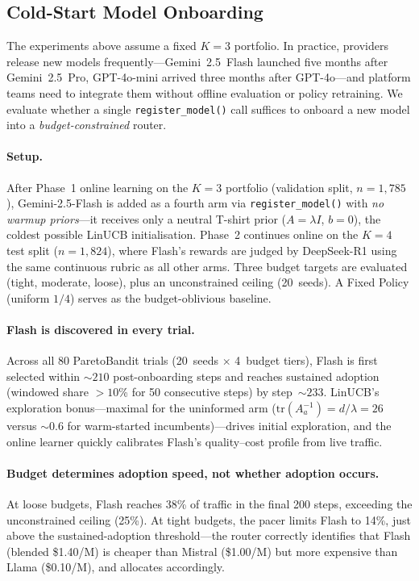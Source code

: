 \subsection{Cold-Start Model Onboarding}
\label{sec:exp4_model_onboarding}

The experiments above assume a fixed $K{=}3$ portfolio.  In practice, providers release new models frequently---Gemini~2.5~Flash launched five months after Gemini~2.5~Pro, GPT-4o-mini arrived three months after GPT-4o---and platform teams need to integrate them without offline evaluation or policy retraining.
We evaluate whether a single \texttt{register\_model()} call suffices to onboard a new model into a \emph{budget-constrained} router.

\paragraph{Setup.}
After Phase~1 online learning on the $K{=}3$ portfolio (validation split, $n{=}1{,}785$), Gemini-2.5-Flash is added as a fourth arm via \texttt{register\_model()} with \emph{no warmup priors}---it receives only a neutral T-shirt prior ($A{=}\lambda I$, $b{=}0$), the coldest possible LinUCB initialisation.
Phase~2 continues online on the $K{=}4$ test split ($n{=}1{,}824$), where Flash's rewards are judged by DeepSeek-R1 using the same continuous rubric as all other arms.
Three budget targets are evaluated (tight, moderate, loose), plus an unconstrained ceiling (20~seeds).
A Fixed Policy (uniform $1/4$) serves as the budget-oblivious baseline.

\paragraph{Flash is discovered in every trial.}
Across all 80 ParetoBandit trials (20~seeds $\times$ 4~budget tiers), Flash is first selected within ${\sim}210$ post-onboarding steps and reaches sustained adoption (windowed share ${>}10$\% for 50 consecutive steps) by step~${\sim}233$.
LinUCB's exploration bonus---maximal for the uninformed arm ($\mathrm{tr}(A_a^{-1}) = d/\lambda = 26$ versus ${\sim}0.6$ for warm-started incumbents)---drives initial exploration, and the online learner quickly calibrates Flash's quality--cost profile from live traffic.

\paragraph{Budget determines adoption speed, not whether adoption occurs.}
At loose budgets, Flash reaches 38\% of traffic in the final 200 steps, exceeding the unconstrained ceiling (25\%).
At tight budgets, the pacer limits Flash to 14\%, just above the sustained-adoption threshold---the router correctly identifies that Flash (blended \$1.40/M) is cheaper than Mistral (\$1.00/M) but more expensive than Llama (\$0.10/M), and allocates accordingly.

